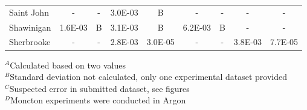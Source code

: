 \documentclass{book}
\begin{document}
\begin{table}[ht]
\begin{center}
\begin{tabular}{|l|cc|cc|cc|cc|}
Saint John              & -           & -               & 3.0E-03        & B                & -          & -                 & -           & -                     \\
Shawinigan              & 1.6E-03     & B               & 3.1E-03        & B                & 6.2E-03    & B                 & -           & -                     \\
Sherbrooke              & -           & -               & 2.8E-03        & 3.0E-05          & -          & -                 & 3.8E-03     & 7.7E-05               \\  \hline
\end{tabular}
\end{center}
$^A$Calculated based on two values \\
$^B$Standard deviation not calculated, only one experimental dataset provided \\
$^C$Suspected error in submitted dataset, see figures \\
$^D$Moncton experiments were conducted in Argon
\end{table}
\end{document}
